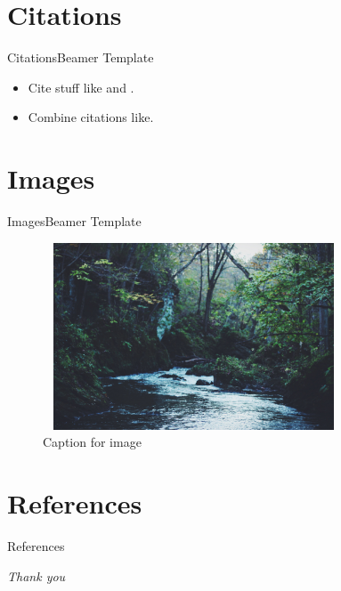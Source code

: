 \documentclass[hyperref={pdfpagemode=UseOutlines}]{beamer}
\numberwithin{equation}{mycounter} %
\numberwithin{table}{mycounter}
\begin{document}
\section{Citations}
\begin{frame}{Citations}{Beamer Template}
    \begin{itemize}
        \item Cite stuff like \cite{article} and \cite{misc}.
        \item Combine citations like\cite{book,incollection}.
    \end{itemize}
\end{frame}

\section{Images}
\begin{frame}{Images}{Beamer Template}
    \begin{figure}
        \begin{minipage}{\textwidth}
            \centering
            \includegraphics[width=0.8\textwidth,height=15em]{stream.jpg}
            \caption{Caption for image}
            \label{fig:sample_figure}
        \end{minipage}
    \end{figure}
\end{frame}

\section{References}
\begin{frame}[allowframebreaks]{References}
    \nocite{*}
    \printbibliography
\end{frame}

\begin{frame}
    \centering \Large
    \emph{Thank you}
\end{frame}
\end{document}
